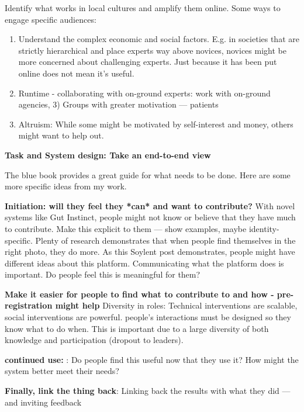 Identify what works in local cultures and amplify them online. Some ways to engage specific audiences: 
\begin{enumerate}
\item Understand the complex economic and social factors. E.g. in societies that are strictly hierarchical and place experts way above novices, novices might be more concerned about challenging experts. Just because it has been put online does not mean it’s useful. 
\item Runtime - collaborating with on-ground experts: work with on-ground agencies, 3) Groups with greater motivation — patients
\item Altruism: While some might be motivated by self-interest and money, others might want to help out. 

\end{enumerate}

\textbf{Task and System design: Take an end-to-end view}

The blue book provides a great guide for what needs to be done. Here are some more specific ideas from my work.

\textbf{Initiation: will they feel they *can* and want to contribute?} With novel systems like Gut Instinct, people might not know or believe that they have much to contribute. Make this explicit to them — show examples, maybe identity-specific. Plenty of research demonstrates that when people find themselves in the right photo, they do more. As this Soylent post demonstrates, people might have different ideas about this platform. Communicating what the platform does is important. Do people feel this is meaningful for them?

\textbf{Make it easier for people to find what to contribute to and how - pre-registration might help} Diversity in roles: Technical interventions are scalable, social interventions are powerful. people’s interactions must be designed so they know what to do when. This is important due to a large diversity of both knowledge and participation  (dropout to leaders). 

\textbf{continued use: }:  Do people find this useful now that they use it? How might the system better meet their needs?


\textbf{Finally, link the thing back}: Linking back the results with what they did — and inviting feedback 


